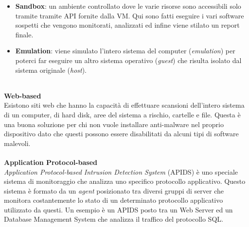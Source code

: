 \begin{itemize}
    \item \textbf{Sandbox}: un ambiente controllato dove le varie risorse sono accessibili solo tramite tramite API fornite dalla VM. Qui sono fatti eseguire i vari software sospetti che vengono monitorati, analizzati ed infine viene stilato un report finale.
    \item \textbf{Emulation}: viene simulato l'intero sistema del computer (\textit{emulation}) per poterci far eseguire un altro sistema operativo (\textit{guest}) che risulta isolato dal sistema originale (\textit{host}).
\end{itemize}
\ \\    %
\textbf{Web-based}\\
Esistono siti web che hanno la capacità di effettuare scansioni dell'intero sistema di un computer, di hard disk, aree del sistema a rischio, cartelle e file. Questa è una buona soluzione per chi non vuole installare anti-malware nel proprio dispositivo dato che questi possono essere disabilitati da alcuni tipi di software malevoli.\\
\\
\textbf{Application Protocol-based}\\
\textit{Application Protocol-based Intrusion Detection System} (APIDS) è uno speciale sistema di monitoraggio che analizza uno specifico protocollo applicativo. Questo sistema è formato da un \textit{agent} posizionato tra diversi gruppi di server che monitora costantemente lo stato di un determinato protocollo applicativo utilizzato da questi. Un esempio è un APIDS posto tra un Web Server ed un Database Management System che analizza il traffico del protocollo SQL.
